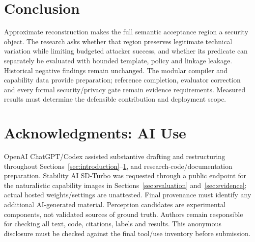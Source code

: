 \documentclass[compsoc,conference,a4paper,10pt,times]{IEEEtran}
\begin{document}
\section{Conclusion}
\label{sec:conclusion}
Approximate reconstruction makes the full semantic acceptance region a security object. The research asks whether that region preserves legitimate technical variation while limiting budgeted attacker success, and whether its predicate can separately be evaluated with bounded template, policy and linkage leakage. Historical negative findings remain unchanged. The modular compiler and capability data provide preparation; reference completion, evaluator correction and every formal security/privacy gate remain evidence requirements. Measured results must determine the defensible contribution and deployment scope.
\label{sec:body-end}

\section*{Acknowledgments: AI Use}
OpenAI ChatGPT/Codex assisted substantive drafting and restructuring throughout Sections~\ref{sec:introduction}--\ref{sec:conclusion}, and research-code/documentation preparation. Stability AI SD-Turbo was requested through a public endpoint for the naturalistic capability images in Sections~\ref{sec:evaluation} and~\ref{sec:evidence}; actual hosted weights/settings are unattested. Final provenance must identify any additional AI-generated material. Perception candidates are experimental components, not validated sources of ground truth. Authors remain responsible for checking all text, code, citations, labels and results. This anonymous disclosure must be checked against the final tool/use inventory before submission.



\end{document}
